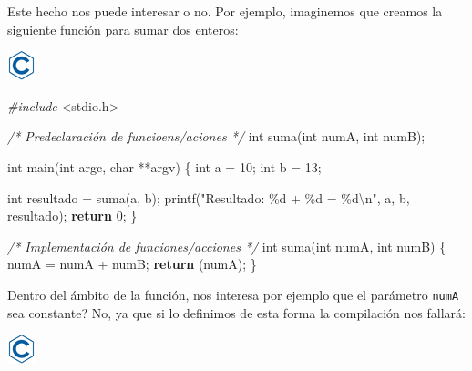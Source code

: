 \documentclass[
]{book}
\newenvironment{Shaded}{\begin{snugshade}}{\end{snugshade}}
\newcommand{\CommentTok}[1]{\textcolor[rgb]{0.56,0.35,0.01}{\textit{#1}}}
\newcommand{\ControlFlowTok}[1]{\textcolor[rgb]{0.13,0.29,0.53}{\textbf{#1}}}
\newcommand{\DataTypeTok}[1]{\textcolor[rgb]{0.13,0.29,0.53}{#1}}
\newcommand{\DecValTok}[1]{\textcolor[rgb]{0.00,0.00,0.81}{#1}}
\newcommand{\ImportTok}[1]{#1}
\newcommand{\NormalTok}[1]{#1}
\newcommand{\PreprocessorTok}[1]{\textcolor[rgb]{0.56,0.35,0.01}{\textit{#1}}}
\newcommand{\SpecialCharTok}[1]{\textcolor[rgb]{0.00,0.00,0.00}{#1}}
\newcommand{\StringTok}[1]{\textcolor[rgb]{0.31,0.60,0.02}{#1}}
\begin{document}
Este hecho nos puede interesar o no. Por ejemplo, imaginemos que creamos la siguiente función para sumar dos enteros:

\includegraphics{./img/c.png}

\begin{Shaded}
\begin{Highlighting}[]
\PreprocessorTok{\#include }\ImportTok{\textless{}stdio.h\textgreater{}}

\CommentTok{/* Predeclaración de funcioens/aciones */}
\DataTypeTok{int}\NormalTok{ suma(}\DataTypeTok{int}\NormalTok{ numA, }\DataTypeTok{int}\NormalTok{ numB);}

\DataTypeTok{int}\NormalTok{ main(}\DataTypeTok{int}\NormalTok{ argc, }\DataTypeTok{char}\NormalTok{ **argv) \{}
    \DataTypeTok{int}\NormalTok{ a = }\DecValTok{10}\NormalTok{;}
    \DataTypeTok{int}\NormalTok{ b = }\DecValTok{13}\NormalTok{;}

    \DataTypeTok{int}\NormalTok{ resultado = suma(a, b);}
\NormalTok{    printf(}\StringTok{"Resultado: \%d + \%d = \%d}\SpecialCharTok{\textbackslash{}n}\StringTok{"}\NormalTok{, a, b, resultado);}
    \ControlFlowTok{return} \DecValTok{0}\NormalTok{;}
\NormalTok{\}}

\CommentTok{/* Implementación de funciones/acciones */}
\DataTypeTok{int}\NormalTok{ suma(}\DataTypeTok{int}\NormalTok{ numA, }\DataTypeTok{int}\NormalTok{ numB) \{}
\NormalTok{    numA = numA + numB;}
    \ControlFlowTok{return}\NormalTok{ (numA);}
\NormalTok{\}}
\end{Highlighting}
\end{Shaded}

Dentro del ámbito de la función, nos interesa por ejemplo que el parámetro \texttt{numA} sea constante? No, ya que si lo definimos de esta forma la compilación nos fallará:

\includegraphics{./img/c.png}
\end{document}
